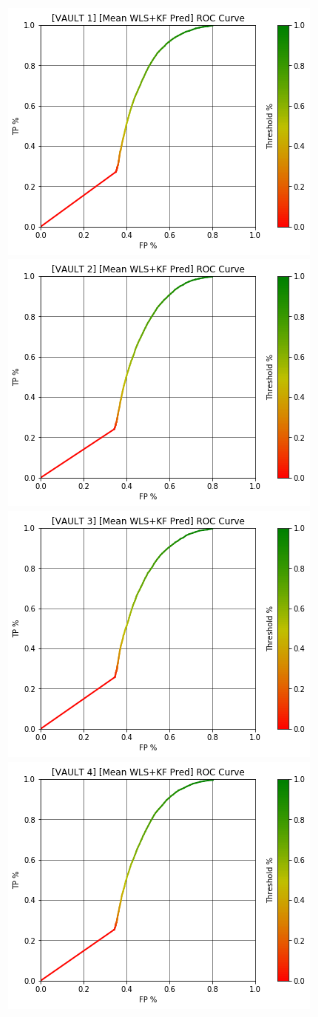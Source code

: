 \begin{figure}[h]
\centering
\includegraphics[width=8cm]{body/results/Graphs/JustSeries/1.PerformaceofMean/4.Combine/Raw/v1.png}
\includegraphics[width=8cm]{body/results/Graphs/JustSeries/1.PerformaceofMean/4.Combine/Raw/v2.png}
\includegraphics[width=8cm]{body/results/Graphs/JustSeries/1.PerformaceofMean/4.Combine/Raw/v3.png}
\includegraphics[width=8cm]{body/results/Graphs/JustSeries/1.PerformaceofMean/4.Combine/Raw/v4.png}

\end{figure}

